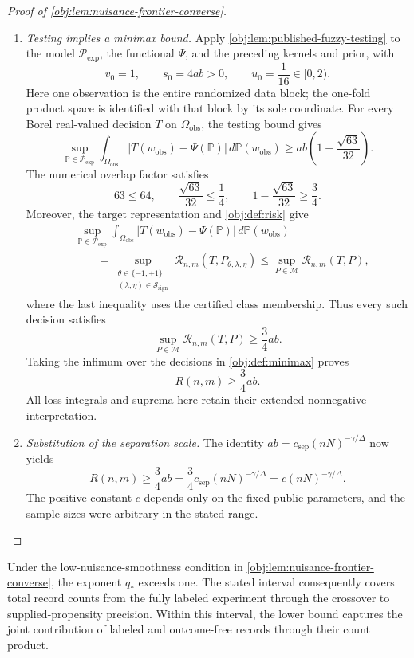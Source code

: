 \documentclass[11pt]{article}
\begin{document}
\begin{proof}[Proof of \cref{obj:lem:nuisance-frontier-converse}]
\begin{enumerate}
\item \textit{Testing implies a minimax bound.}
Apply \cref{obj:lem:published-fuzzy-testing} to the model \(\mathcal P_{\mathrm{exp}}\), the functional \(\Psi\), and the preceding kernels and prior, with
\[
v_0=1,\qquad s_0=4ab>0,\qquad
u_0=\frac1{16}\in[0,2).
\]
Here one observation is the entire randomized data block; the one-fold product space is identified with that block by its sole coordinate. For every Borel real-valued decision \(T\) on \(\Omega_{\mathrm{obs}}\), the testing bound gives
\[
\sup_{\mathbb P\in\mathcal P_{\mathrm{exp}}}
\int_{\Omega_{\mathrm{obs}}}
\left|T(w_{\mathrm{obs}})-\Psi(\mathbb P)\right|
\,d\mathbb P(w_{\mathrm{obs}})
\ge
ab\left(1-\frac{\sqrt{63}}{32}\right).
\]
The numerical overlap factor satisfies
\[
63\le64,\qquad
\frac{\sqrt{63}}{32}\le\frac14,\qquad
1-\frac{\sqrt{63}}{32}\ge\frac34.
\]
Moreover, the target representation and \cref{obj:def:risk} give
\[
\begin{aligned}
&\sup_{\mathbb P\in\mathcal P_{\mathrm{exp}}}
\int_{\Omega_{\mathrm{obs}}}
\left|T(w_{\mathrm{obs}})-\Psi(\mathbb P)\right|
\,d\mathbb P(w_{\mathrm{obs}})\\
&\qquad=
\sup_{\substack{\theta\in\{-1,+1\}\\
(\lambda,\eta)\in\mathcal S_{\mathrm{sign}}}}
\mathcal R_{n,m}(T,P_{\theta,\lambda,\eta})
\le
\sup_{P\in\mathcal M}\mathcal R_{n,m}(T,P),
\end{aligned}
\]
where the last inequality uses the certified class membership. Thus every such decision satisfies
\[
\sup_{P\in\mathcal M}\mathcal R_{n,m}(T,P)\ge\frac34ab.
\]
Taking the infimum over the decisions in \cref{obj:def:minimax} proves
\[
R(n,m)\ge\frac34ab.
\]
All loss integrals and suprema here retain their extended nonnegative interpretation.

\item \textit{Substitution of the separation scale.}
The identity \(ab=c_{\mathrm{sep}}(nN)^{-\gamma/\Delta}\) now yields
\[
R(n,m)
\ge\frac34ab
=\frac34c_{\mathrm{sep}}(nN)^{-\gamma/\Delta}
=c(nN)^{-\gamma/\Delta}.
\]
The positive constant \(c\) depends only on the fixed public parameters, and the sample sizes were arbitrary in the stated range.
\end{enumerate}
\end{proof}

Under the low-nuisance-smoothness condition in \cref{obj:lem:nuisance-frontier-converse}, the exponent \(q_*\) exceeds one. The stated interval consequently covers total record counts from the fully labeled experiment through the crossover to supplied-propensity precision. Within this interval, the lower bound captures the joint contribution of labeled and outcome-free records through their count product.
\end{document}
